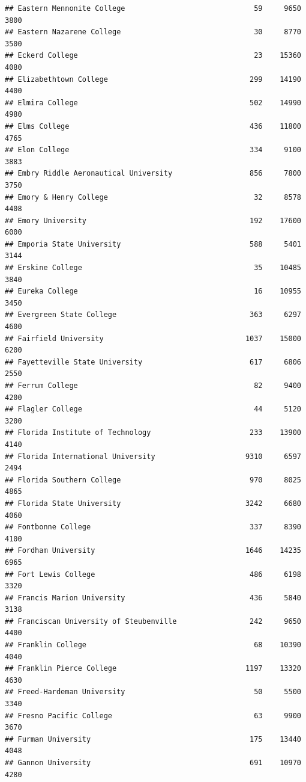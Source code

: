 \documentclass[
]{article}
\begin{document}
\begin{verbatim}
## Eastern Mennonite College                              59     9650       3800
## Eastern Nazarene College                               30     8770       3500
## Eckerd College                                         23    15360       4080
## Elizabethtown College                                 299    14190       4400
## Elmira College                                        502    14990       4980
## Elms College                                          436    11800       4765
## Elon College                                          334     9100       3883
## Embry Riddle Aeronautical University                  856     7800       3750
## Emory & Henry College                                  32     8578       4408
## Emory University                                      192    17600       6000
## Emporia State University                              588     5401       3144
## Erskine College                                        35    10485       3840
## Eureka College                                         16    10955       3450
## Evergreen State College                               363     6297       4600
## Fairfield University                                 1037    15000       6200
## Fayetteville State University                         617     6806       2550
## Ferrum College                                         82     9400       4200
## Flagler College                                        44     5120       3200
## Florida Institute of Technology                       233    13900       4140
## Florida International University                     9310     6597       2494
## Florida Southern College                              970     8025       4865
## Florida State University                             3242     6680       4060
## Fontbonne College                                     337     8390       4100
## Fordham University                                   1646    14235       6965
## Fort Lewis College                                    486     6198       3320
## Francis Marion University                             436     5840       3138
## Franciscan University of Steubenville                 242     9650       4400
## Franklin College                                       68    10390       4040
## Franklin Pierce College                              1197    13320       4630
## Freed-Hardeman University                              50     5500       3340
## Fresno Pacific College                                 63     9900       3670
## Furman University                                     175    13440       4048
## Gannon University                                     691    10970       4280

\end{verbatim}
\end{document}
